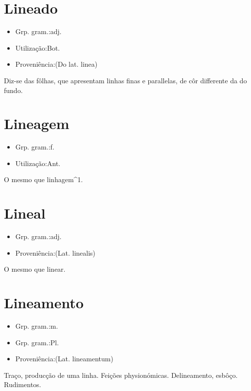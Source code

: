 \section{Lineado}
\begin{itemize}
\item {Grp. gram.:adj.}
\end{itemize}
\begin{itemize}
\item {Utilização:Bot.}
\end{itemize}
\begin{itemize}
\item {Proveniência:(Do lat. \textunderscore linea\textunderscore )}
\end{itemize}
Diz-se das fôlhas, que apresentam linhas finas e parallelas, de côr differente da do fundo.
\section{Lineagem}
\begin{itemize}
\item {Grp. gram.:f.}
\end{itemize}
\begin{itemize}
\item {Utilização:Ant.}
\end{itemize}
O mesmo que \textunderscore linhagem\textunderscore ^1.
\section{Lineal}
\begin{itemize}
\item {Grp. gram.:adj.}
\end{itemize}
\begin{itemize}
\item {Proveniência:(Lat. \textunderscore linealis\textunderscore )}
\end{itemize}
O mesmo que \textunderscore linear\textunderscore .
\section{Lineamento}
\begin{itemize}
\item {Grp. gram.:m.}
\end{itemize}
\begin{itemize}
\item {Grp. gram.:Pl.}
\end{itemize}
\begin{itemize}
\item {Proveniência:(Lat. \textunderscore lineamentum\textunderscore )}
\end{itemize}
Traço, producção de uma linha.
Feições physionómicas.
Delineamento, esbôço.
Rudimentos.
